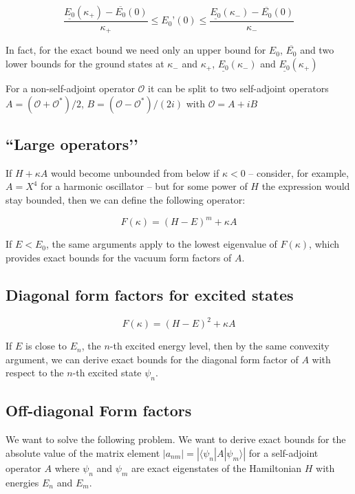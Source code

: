 \documentclass{article}
\theoremstyle{definition}
\begin{document}
\begin{equation}
\frac{\underline{E_0}(\kappa_+) - \overline{E_0}(0)}{\kappa_+}
\le
E_0’(0)
\le
\frac{\underline{E_0}(\kappa_-) - \overline{E_0}(0)}{\kappa_-}
\end{equation}

In fact, for the exact bound we need only an upper bound for $E_0$, $\overline{E_0}$ and two lower bounds for the ground states at $ \kappa_-$ and $ \kappa_+$, $\underline{E_0}(\kappa_-)$ and $\underline{E_0}(\kappa_+)$

For a non-self-adjoint operator $\mathcal{O}$ it can be split to two self-adjoint operators $A=(\mathcal{O}+\mathcal{O}^*)/2$, $B=(\mathcal{O}-\mathcal{O}^*)/(2 i)$ with $\mathcal{O}=A+ i B$

\subsection{``Large operators’'}

If $H+\kappa A$ would become unbounded from below if $\kappa<0$ – consider, for example, $A=X^4$ for a harmonic oscillator – but for some power of $H$ the expression would stay bounded, then we can define the following operator:

\begin{equation}
F(\kappa)=(H-E)^m + \kappa A
\end{equation}

If $E < E_0$, the same arguments apply to the lowest eigenvalue of $F(\kappa)$, which provides exact bounds for the vacuum form factors of $A$.
\subsection{Diagonal form factors for excited states}

\begin{equation}
    F(\kappa) = (H-E)^2+\kappa A
\end{equation}

If $E$ is close to $E_n$, the $n$-th excited energy level, then by the same convexity argument, we can derive exact bounds for the diagonal form factor of $A$ with respect to the $n$-th excited state $\psi_n$.
\subsection{Off-diagonal Form factors}

We want to solve the following problem. We want to derive exact bounds for the absolute value of the matrix element $|a_{nm}|=|\langle \psi_n | A | \psi_m \rangle|$ for a self-adjoint operator $A$ where $\psi_n$ and $\psi_m$ are exact eigenstates of the Hamiltonian $H$ with energies $E_n$ and $E_m$.
\end{document}

